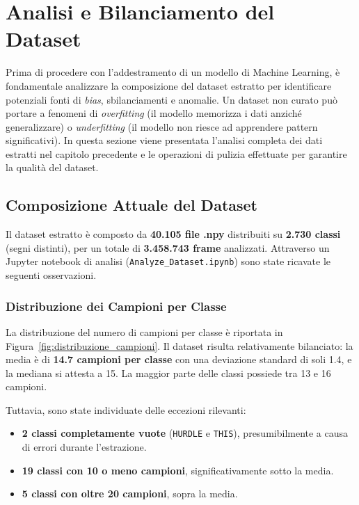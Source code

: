 
\section{Analisi e Bilanciamento del Dataset}

Prima di procedere con l'addestramento di un modello di Machine Learning, è fondamentale analizzare la composizione del dataset estratto per identificare potenziali fonti di \textit{bias}, sbilanciamenti e anomalie. Un dataset non curato può portare a fenomeni di \textit{overfitting} (il modello memorizza i dati anziché generalizzare) o \textit{underfitting} (il modello non riesce ad apprendere pattern significativi). In questa sezione viene presentata l'analisi completa dei dati estratti nel capitolo precedente e le operazioni di pulizia effettuate per garantire la qualità del dataset.

\subsection{Composizione Attuale del Dataset}

Il dataset estratto è composto da \textbf{40.105 file .npy} distribuiti su \textbf{2.730 classi} (segni distinti), per un totale di \textbf{3.458.743 frame} analizzati. Attraverso un Jupyter notebook di analisi (\texttt{Analyze\_Dataset.ipynb}) sono state ricavate le seguenti osservazioni.

\subsubsection{Distribuzione dei Campioni per Classe}

La distribuzione del numero di campioni per classe è riportata in Figura~\ref{fig:distribuzione_campioni}. Il dataset risulta relativamente bilanciato: la media è di \textbf{14.7 campioni per classe} con una deviazione standard di soli 1.4, e la mediana si attesta a 15. La maggior parte delle classi possiede tra 13 e 16 campioni.

Tuttavia, sono state individuate delle eccezioni rilevanti:
\begin{itemize}
    \item \textbf{2 classi completamente vuote} (\texttt{HURDLE} e \texttt{THIS}), presumibilmente a causa di errori durante l'estrazione.
    \item \textbf{19 classi con 10 o meno campioni}, significativamente sotto la media.
    \item \textbf{5 classi con oltre 20 campioni}, sopra la media.
\end{itemize}

